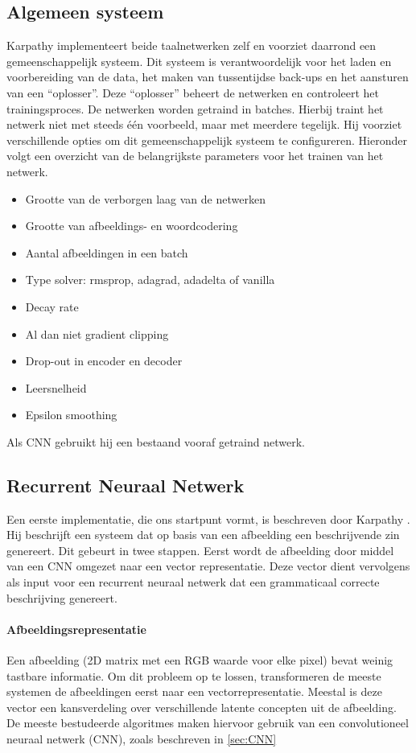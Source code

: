 \subsection{Algemeen systeem}
Karpathy implementeert beide taalnetwerken zelf en voorziet daarrond een gemeenschappelijk systeem. Dit systeem is verantwoordelijk voor het laden en voorbereiding van de data, het maken van tussentijdse back-ups en het aansturen van een ``oplosser''. Deze ``oplosser'' beheert de netwerken en controleert het trainingsproces. De netwerken worden getraind in batches. Hierbij traint het netwerk niet met steeds \'e\'en voorbeeld, maar met meerdere tegelijk. 
Hij voorziet verschillende opties om dit gemeenschappelijk systeem te configureren. Hieronder volgt een overzicht van de belangrijkste parameters voor het trainen van het netwerk.
\begin{itemize}
	\item Grootte van de verborgen laag van de netwerken
	\item Grootte van afbeeldings- en woordcodering
	\item Aantal afbeeldingen in een batch
	\item Type solver: rmsprop, adagrad, adadelta of vanilla
	\item Decay rate
	\item Al dan niet gradient clipping
	\item Drop-out in encoder en decoder
	\item Leersnelheid
	\item Epsilon smoothing
\end{itemize}
Als CNN gebruikt hij een bestaand vooraf getraind netwerk.

\subsection{Recurrent Neuraal Netwerk}
\label{sec:rnn_methodology}
Een eerste implementatie, die ons startpunt vormt, is beschreven door Karpathy \cite{Karpathy2015}. Hij beschrijft een systeem dat op basis van een afbeelding een beschrijvende zin genereert. Dit gebeurt in twee stappen. Eerst wordt de afbeelding door middel van een CNN omgezet naar een vector representatie. Deze vector dient vervolgens als input voor een recurrent neuraal netwerk dat een grammaticaal correcte beschrijving genereert.

\paragraph{Afbeeldingsrepresentatie}
\label{sec:usedcnn}
Een afbeelding (2D matrix met een RGB waarde voor elke pixel) bevat weinig tastbare informatie. Om dit probleem op te lossen, transformeren de meeste systemen de afbeeldingen eerst naar een vectorrepresentatie. Meestal is deze vector een kansverdeling over verschillende latente concepten uit de afbeelding. De meeste bestudeerde algoritmes maken hiervoor gebruik van een convolutioneel neuraal netwerk (CNN), zoals beschreven in \ref{sec:CNN}

